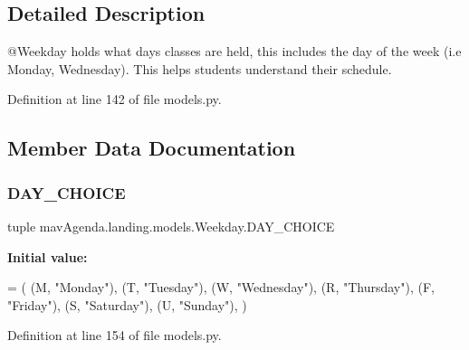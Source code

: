 \subsection{Detailed Description}
\begin{DoxyVerb}@Weekday holds what days classes are held, this includes the
        day of the week (i.e Monday, Wednesday). This helps students understand their schedule.
\end{DoxyVerb}
 

Definition at line 142 of file models.\+py.



\subsection{Member Data Documentation}
\mbox{\label{classmavAgenda_1_1landing_1_1models_1_1Weekday_ad3467f25c1365f72054c0ac79dd457ef}} 
\subsubsection{\texorpdfstring{D\+A\+Y\+\_\+\+C\+H\+O\+I\+CE}{DAY\_CHOICE}}
{\footnotesize\ttfamily tuple mav\+Agenda.\+landing.\+models.\+Weekday.\+D\+A\+Y\+\_\+\+C\+H\+O\+I\+CE\hspace{0.3cm}{\ttfamily [static]}}

{\bfseries Initial value\+:}
\begin{DoxyCode}
=  (
        (M, \textcolor{stringliteral}{"Monday"}),
        (T, \textcolor{stringliteral}{"Tuesday"}),
        (W, \textcolor{stringliteral}{"Wednesday"}),
        (R, \textcolor{stringliteral}{"Thursday"}),
        (F, \textcolor{stringliteral}{"Friday"}),
        (S, \textcolor{stringliteral}{"Saturday"}),
        (U, \textcolor{stringliteral}{"Sunday"}),
    )
\end{DoxyCode}


Definition at line 154 of file models.\+py.

\mbox{\label{classmavAgenda_1_1landing_1_1models_1_1Weekday_ac86da883fd1945932c224e0d26ecbebd}} 
